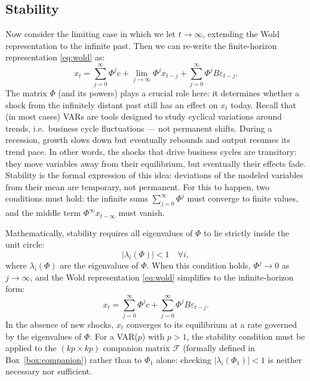 \documentclass[12pt]{article}
\begin{document}
\subsection{Stability}\label{sec:stability}

Now consider the limiting case in which we let $t\to\infty$, extending the Wold representation to the infinite past. Then we can re-write the finite-horizon representation \eqref{eq:wold} as:
\begin{equation}
	x_{t}=\sum_{j=0}^{\infty}\Phi^{j}c + \lim_{j\to\infty}\Phi^j x_{t-j}+\sum_{j=0}^{\infty}\Phi^{j}B\varepsilon_{t-j}.
\end{equation}%
The matrix $\Phi$ (and its powers) plays a crucial role here: it determines whether a shock from the infinitely distant past still has an effect on $x_t$ today. Recall that (in most cases) VARs are tools designed to study cyclical variations around trends, i.e.\ business cycle fluctuations --- not permanent shifts. During a recession, growth slows down but eventually rebounds and output resumes its trend pace. In other words, the shocks that drive business cycles are transitory: they move variables away from their equilibrium, but eventually their effects fade. Stability is the formal expression of this idea: deviations of the modeled variables from their mean are temporary, not permanent. For this to happen, two conditions must hold: the infinite sums $\sum_{j=0}^{\infty}\Phi^{j}$ must converge to finite values, and the middle term $\Phi^{\infty}x_{t-\infty}$ must vanish.

Mathematically, stability requires all eigenvalues of $\Phi$ to lie strictly inside the unit circle:
\begin{equation}
	|\lambda_i(\Phi)| < 1 \quad \forall i,
\end{equation}%
where $\lambda_i(\Phi)$ are the eigenvalues of $\Phi$. When this condition holds, $\Phi^j \to 0$ as $j\to\infty$, and the Wold representation \eqref{eq:wold} simplifies to the infinite-horizon form:
\begin{equation}\label{eq:wold_inf}
	x_{t}=\sum_{j=0}^{\infty}\Phi^{j}c+\sum_{j=0}^{\infty}\Phi^{j}B\varepsilon_{t-j}.
\end{equation}%
In the absence of new shocks, $x_t$ converges to its equilibrium at a rate governed by the eigenvalues of $\Phi$. For a VAR($p$) with $p>1$, the stability condition must be applied to the $(kp\times kp)$ companion matrix $\mathcal{F}$ (formally defined in Box~\ref{box:companion}) rather than to $\Phi_1$ alone: checking $|\lambda_i(\Phi_1)|<1$ is neither necessary nor sufficient.
\end{document}
